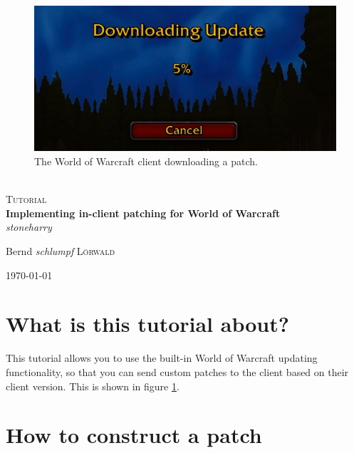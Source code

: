 \documentclass{article}
\newcommand{\wow}{World of Warcraft\xspace}
\begin{document}
\begin{titlepage}

\begin{center}

\begin{figure}
	\includegraphics[width=\textwidth]{client_downloading}
	\caption{The \wow client downloading a patch.}
	\label{fig:download}
\end{figure}

\textsc{}\\[1cm]

\textsc{\Large Tutorial}\\[0.5cm]

{ \huge \bfseries Implementing in-client patching for \wow}\\[2cm]


\large \emph{\glqq{}stoneharry\grqq{}}

\large Bernd \emph{\glqq{}schlumpf\grqq{}} \textsc{L\"orwald}

\vfill

{\large \today}

\end{center}

\end{titlepage}

\section{What is this tutorial about?}

This tutorial allows you to use the built-in \wow updating functionality, so that you can send custom patches to the client based on their client version. This is shown in figure \ref{fig:download}.

\section{How to construct a patch}
\end{document}
